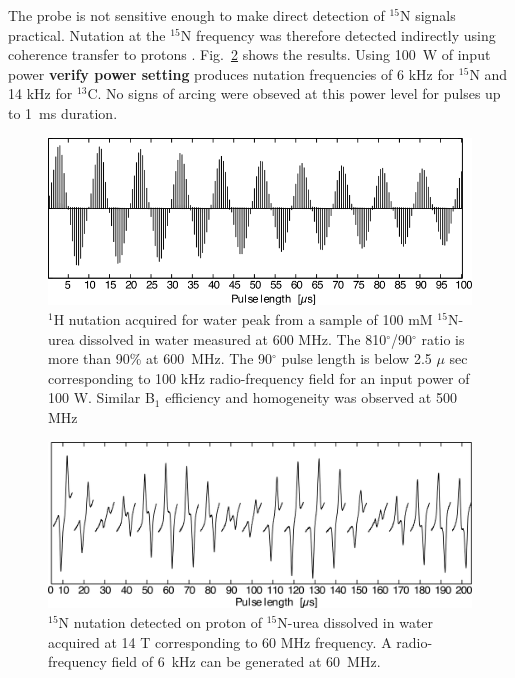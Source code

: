 \documentclass[preprint,5p]{elsarticle}
\newcommand{\todo}[1]{{\color{red}\textbf{#1}}}
\newcommand{\fig}[1]{Fig.~\ref{#1}}
\begin{document}
The probe is not sensitive enough to make direct detection of $^{15}$N signals practical. Nutation at the
$^{15}$N frequency was therefore detected indirectly using coherence transfer to protons \cite{bax_indirect}. 
\fig{fig:15N-nutation} shows the results. Using 100~W of input power \todo{verify power setting} 
produces nutation frequencies of 6 kHz for $^{15}$N and 14 kHz for $^{13}$C. 
No signs of arcing were obseved at this power level for pulses up to 1~ms duration.

\begin{figure}
\centering
\includegraphics[width=.7\linewidth,keepaspectratio=true]{./figures/ms5n17-tlp-sp-150218-1-Hnutation-171216-103.png} 
\caption{$^1$H nutation acquired for water peak from a sample of 100 mM $^{15}$N-urea dissolved in water measured at 600 MHz. The 810$^{\circ}$/90$^{\circ}$ ratio is more than 90\% at 600~MHz. The 90$^{\circ}$ pulse length is below 2.5 $\mu$ sec corresponding to 100 kHz radio-frequency field for an input power of 100 W. Similar B$_{1}$ efficiency and homogeneity was observed at 500 MHz}
\label{fig:1H-nutation} 
\end{figure}

\begin{figure}
\centering
\includegraphics[width=.7\linewidth,keepaspectratio=true]{./figures/ms5n17-tlp-sp-150218-15-Nnutation-171215-003.png} 
\caption{$^{15}$N nutation detected on proton of $^{15}$N-urea dissolved in water acquired at 14 T corresponding to 60 MHz frequency. A radio-frequency field of 6~kHz can be generated at 60~MHz.}
\label{fig:15N-nutation} 
\end{figure}
\end{document}

